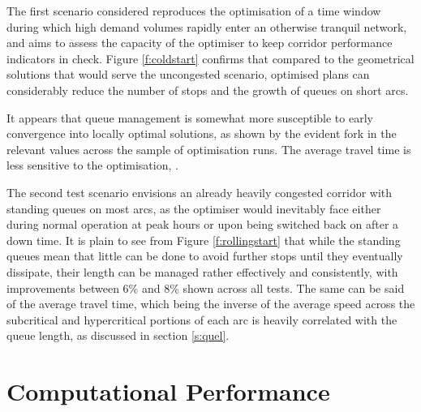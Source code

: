The first scenario considered reproduces the optimisation of a time window during which high demand volumes rapidly enter an otherwise tranquil network, and aims to assess the capacity of the optimiser to keep corridor performance indicators in check. Figure \ref{f:coldstart} confirms that compared to the geometrical solutions that would serve the uncongested scenario, optimised plans can considerably reduce the number of stops and the growth of queues on short arcs. 


It appears that queue management is somewhat more susceptible to early convergence into locally optimal solutions, as shown by the evident fork in the relevant values across the sample of optimisation runs. The average travel time is less sensitive to the optimisation, .


The second test scenario envisions an already heavily congested  corridor with standing queues on most arcs, as the optimiser would inevitably face either during normal operation at peak hours or upon being switched back on after a down time. It is plain to see from Figure \ref{f:rollingstart} that while the standing queues mean that little can be done to avoid further stops until they eventually dissipate, their length can be managed rather effectively and consistently, with improvements between 6\% and 8\% shown across all tests. The same can be said of the average travel time, which being the inverse of the average speed across the subcritical and hypercritical portions of each arc is heavily correlated with the queue length, as discussed in section \ref{s:quel}.





\section{Computational Performance}

